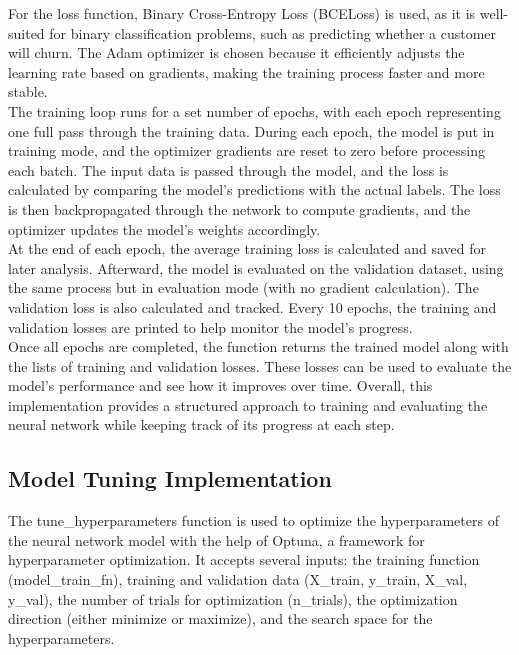 For the loss function, Binary Cross-Entropy Loss (BCELoss) is used, as it is well-suited for binary classification problems, such as predicting whether a customer will churn. The Adam optimizer is chosen because it efficiently adjusts the learning rate based on gradients, making the training process faster and more stable.\\

The training loop runs for a set number of epochs, with each epoch representing one full pass through the training data. During each epoch, the model is put in training mode, and the optimizer gradients are reset to zero before processing each batch. The input data is passed through the model, and the loss is calculated by comparing the model’s predictions with the actual labels. The loss is then backpropagated through the network to compute gradients, and the optimizer updates the model's weights accordingly.\\

At the end of each epoch, the average training loss is calculated and saved for later analysis. Afterward, the model is evaluated on the validation dataset, using the same process but in evaluation mode (with no gradient calculation). The validation loss is also calculated and tracked. Every 10 epochs, the training and validation losses are printed to help monitor the model's progress.\\

Once all epochs are completed, the function returns the trained model along with the lists of training and validation losses. These losses can be used to evaluate the model's performance and see how it improves over time. Overall, this implementation provides a structured approach to training and evaluating the neural network while keeping track of its progress at each step.

\subsection{Model Tuning Implementation}
The tune\_hyperparameters function is used to optimize the hyperparameters of the neural network model with the help of Optuna, a framework for hyperparameter optimization. It accepts several inputs: the training function (model\_train\_fn), training and validation data (X\_train, y\_train, X\_val, y\_val), the number of trials for optimization (n\_trials), the optimization direction (either minimize or maximize), and the search space for the hyperparameters.\\

